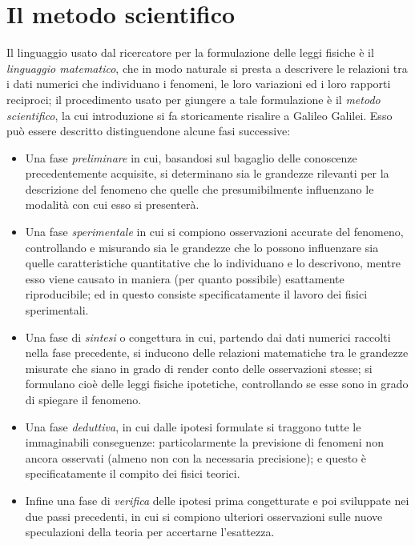 \section{Il metodo scientifico}%
%
Il linguaggio usato dal ricercatore per la formulazione
delle leggi fisiche \`e il \emph{linguaggio matematico}, che
in modo naturale si presta a descrivere le relazioni tra i
dati numerici che individuano i fenomeni, le loro variazioni
ed i loro rapporti reciproci; il procedimento usato per
giungere a tale formulazione \`e il \emph{metodo
  scientifico}, la cui introduzione si fa storicamente
risalire a Galileo Galilei.  Esso pu\`o essere descritto
distinguendone alcune fasi successive:
\begin{itemize}
\item Una fase \emph{preliminare} in cui, basandosi sul
  bagaglio delle conoscenze precedentemente acquisite, si
  determinano sia le grandezze rilevanti per la descrizione
  del fenomeno che quelle che presumibilmente influenzano le
  modalit\`a con cui esso si presenter\`a.
\item Una fase \emph{sperimentale} in cui si compiono
  osservazioni accurate del fenomeno, controllando e
  misurando sia le grandezze che lo possono influenzare sia
  quelle caratteristiche quantitative che lo individuano e
  lo descrivono, mentre esso viene causato in maniera (per
  quanto possibile) esattamente riproducibile; ed in questo
  consiste specificatamente il lavoro dei fisici
  sperimentali.
\item Una fase di \emph{sintesi} o congettura in cui,
  partendo dai dati numerici raccolti nella fase precedente,
  si inducono delle relazioni matematiche tra le grandezze
  misurate che siano in grado di render conto delle
  osservazioni stesse; si formulano cio\`e delle leggi
  fisiche ipotetiche, controllando se esse sono in grado di
  spiegare il fenomeno.
\item Una fase \emph{deduttiva}, in cui dalle ipotesi
  formulate si traggono tutte le immaginabili conseguenze:
  particolarmente la previsione di fenomeni non ancora
  osservati (almeno non con la necessaria precisione); e
  questo \`e specificatamente il compito dei fisici teorici.
\item Infine una fase di \emph{verifica} delle ipotesi prima
  congetturate e poi sviluppate nei due passi precedenti, in
  cui si compiono ulteriori osservazioni sulle nuove
  speculazioni della teoria per accertarne l'esattezza.
\end{itemize}

